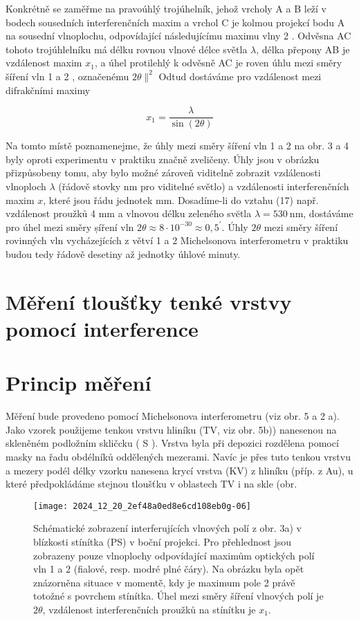 \documentclass[czech,11pt,a4paper]{article}
\begin{document}
\begin{multicols}{2}
	
	
	Konkrétně se zaměřme na pravoúhlý trojúhelník, jehož vrcholy A a B leží v bodech sousedních interferenčních maxim a vrchol C je kolmou projekcí bodu A na sousední vlnoplochu, odpovídající následujícímu maximu vlny 2 . Odvěsna AC tohoto trojúhlelníku má délku rovnou vlnové délce světla $\lambda$, délka přepony AB je vzdálenost maxim $x_{1}$, a úhel protilehlý k odvěsně AC je roven úhlu mezi směry šíření vln 1 a 2 , označenému $2 \theta \|^{2}$ Odtud dostáváme pro vzdálenost mezi difrakčními maximy
	
	
	\begin{equation}
		x_{1}=\frac{\lambda}{\sin (2 \theta)}
	\end{equation}
	
	
	Na tomto místě poznamenejme, že úhly mezi směry šíření vln 1 a 2 na obr. 3 a 4 byly oproti experimentu v praktiku značně zveličeny. Úhly jsou v obrázku přizpůsobeny tomu, aby bylo možné zároveň viditelně zobrazit vzdálenosti vlnoploch $\lambda$ (řádově stovky nm pro viditelné světlo) a vzdálenosti interferenčních maxim $x$, které jsou řádu jednotek mm. Dosadíme-li do vztahu (17) např. vzdálenost proužků 4 mm a vlnovou délku zeleného svĕtla $\lambda=530 \mathrm{~nm}$, dostáváme pro úhel mezi směry șíření vln $2 \theta \approx 8 \cdot 10^{-30} \approx 0,5^{\prime}$. Úhly $2 \theta$ mezi směry šíření rovinných vln vycházejících z větví 1 a 2 Michelsonova interferometru v praktiku budou tedy řádově desetiny až jednotky úhlové minuty.
	
	\section*{Měření tloušťky tenké vrstvy pomocí interference}
	\section*{Princip měření}
	Měření bude provedeno pomocí Michelsonova interferometru (viz obr. 5 a 2 a). Jako vzorek použijeme tenkou vrstvu hliníku (TV, viz obr. 5b)) nanesenou na skleněném podložním skličcku ( S ). Vrstva byla při depozici rozdělena pomocí masky na řadu obdélníků oddělených mezerami. Navíc je přes tuto tenkou vrstvu a mezery podél délky vzorku nanesena krycí vrstva (KV) z hliníku (příp. z Au), u které předpokládáme stejnou tloušťku v oblastech TV i na skle (obr.
	
	\begin{figure}[H]
			\texttt{[image: 2024\_12\_20\_2ef48a0ed8e6cd108eb0g-06]}
			\caption{Schématické zobrazení interferujících vlnových polí z obr. 3a) v blízkosti stínítka (PS) v boční projekci. Pro přehlednost jsou zobrazeny pouze vlnoplochy odpovídající maximům optických polí vln 1 a 2 (fialové, resp. modré plné čáry). Na obrázku byla opět znázorněna situace v momentě, kdy je maximum pole 2 právě totožné s povrchem stínítka. Úhel mezi směry šíření vlnových polí je $2 \theta$, vzdálenost interferenčních proužků na stínítku je $x_{1}$.}
	\end{figure}


\end{multicols}
\end{document}
